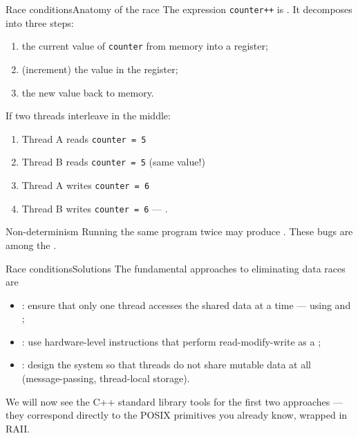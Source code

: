 \begin{frame}{Race conditions}{Anatomy of the race}
	\justifying
	The expression \texttt{counter++} is . It decomposes into three steps:
	\begin{enumerate}
		\item {} the current value of \texttt{counter} from memory into a register;
		\item {} (increment) the value in the register;
		\item {} the new value back to memory.
	\end{enumerate}
	\bigskip
	If two threads interleave in the middle:
	\begin{enumerate}
		\item Thread A reads \texttt{counter = 5}
		\item Thread B reads \texttt{counter = 5} (same value!)
		\item Thread A writes \texttt{counter = 6}
		\item Thread B writes \texttt{counter = 6} — .
	\end{enumerate}
	\bigskip
	\begin{alertblock}{Non-determinism}
		\justifying
		Running the same program twice may produce .
		These bugs are among the .
	\end{alertblock}
\end{frame}
\begin{frame}{Race conditions}{Solutions}
	\justifying
	The fundamental approaches to eliminating data races are
	\begin{itemize}
		\item {}: ensure that only one thread accesses the shared data at a time — using  and ;
		\item {}: use hardware-level instructions that perform read-modify-write as a ;
		\item {}: design the system so that threads do not share mutable data at all (message-passing, thread-local storage).
	\end{itemize}
	\bigskip
	We will now see the C++ standard library tools for the first two approaches — they correspond directly to the POSIX primitives you already know, wrapped in RAII.
\end{frame}
